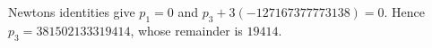 Newton\textquotesingle s identities give $p_1=0$ and $p_3+3(-127167377773138)=0$. Hence $p_3=381502133319414$, whose remainder is $\boxed{19414}$.
